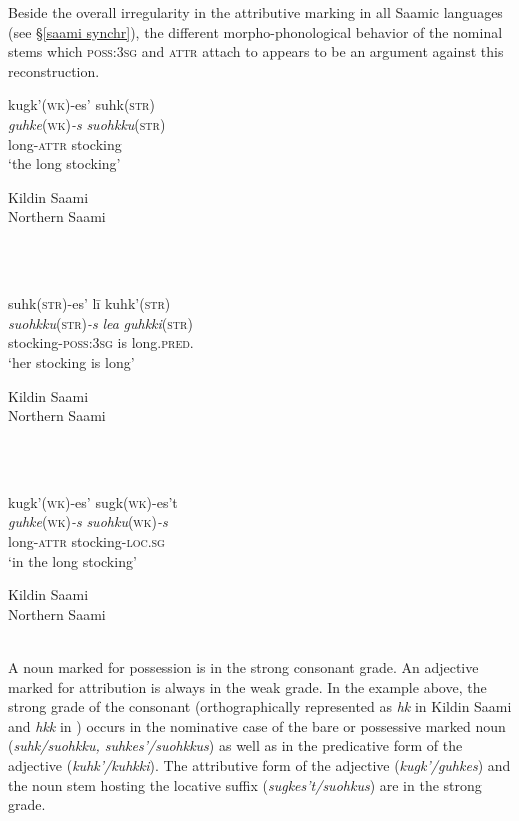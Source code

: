 {Beside the overall irregularity in the attributive marking in all Saamic languages (see \S\ref{saami synchr}), the different morpho-phonological behavior of the nominal stems which \textsc{poss:3sg} and \textsc{attr} attach to appears to be an argument against this reconstruction. 
\begin{exe}
\settowidth{}
\begin{xlist}
\parbox{8.2cm}{
\ex 
\glll 	kugk'{\upshape (\textsc{wk})}-es' suhk{\upshape (\textsc{str})} 	 \\
	\textit{guhke}(\textsc{wk})\textit{-s} \textit{suohkku}(\textsc{str})  \\
	long-\textsc{attr} stocking\\
\glt	‘the long stocking’
}
\parbox{3cm}{\upshape Kildin Saami\\Northern Saami\\~\\}
\\
\parbox{8.2cm}{
\ex 
\glll	suhk{\upshape (\textsc{str})}-es' lī kuhk'{\upshape (\textsc{str})} \\
	\textit{suohkku}(\textsc{str})\textit{-s} \textit{lea} \textit{guhkki}(\textsc{str})\\
	stocking-\textsc{poss:3sg} is long.\textsc{pred.}\\
\glt	‘her stocking is long’
}
\parbox{3cm}{\upshape Kildin Saami\\Northern Saami\\~\\}
\\
\parbox{8.2cm}{
\ex
\glll	kugk'{\upshape (\textsc{wk})}-es' sugk{\upshape (\textsc{wk})}-es't 	 \\
	\textit{guhke}(\textsc{wk})\textit{-s} \textit{suohku}(\textsc{wk})\textit{-s}  \\
	long-\textsc{attr} stocking-\textsc{loc.sg}\\
\glt	‘in the long stocking’
}
\parbox{3cm}{\upshape Kildin Saami\\Northern Saami\\~\\}
\end{xlist}
\end{exe}

A noun marked for possession is in the strong consonant grade. An adjective marked for attribution is always in the weak grade. In the example above, the strong grade of the consonant (orthographically represented as \textit{hk} in Kildin Saami and \textit{hkk} in ) occurs in the nominative case of the bare or possessive marked noun (\textit{suhk/suohkku, suhkes'/suohkkus}) as well as in the predicative form of the adjective (\textit{kuhk'/kuhkki}). The attributive form of the adjective (\textit{kugk'/guhkes}) and the noun stem hosting the locative suffix (\textit{sugkes't/suohkus}) are in the strong grade.

}
